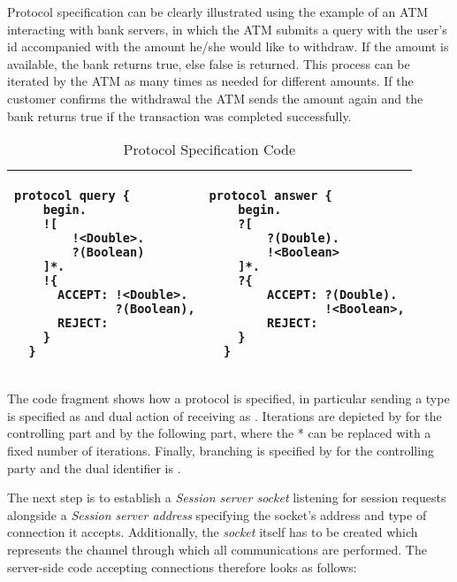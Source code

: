 Protocol specification can be clearly illustrated using the example of an ATM interacting with bank servers, in which the ATM submits a query with the user's id accompanied with the amount he/she would like to withdraw. If the amount is available, the bank returns true, else false is returned. This process can be iterated by the ATM as many times as needed for different amounts. If the customer confirms the withdrawal the ATM sends the amount again and the bank returns true if the transaction was completed successfully.

\begin{table}[H]
\center
\caption{Protocol Specification Code}
\begin{tabular}{|l|l|}
\hline

  \begin{lstlisting}[basicstyle=\LISTINGSTYLE]
  protocol query {
    begin.
    ![
        !<Double>.
        ?(Boolean)
    ]*.
    !{
      ACCEPT: !<Double>.
              ?(Boolean),
      REJECT:
    }
  }
  \end{lstlisting}
  &
  \begin{lstlisting}[basicstyle=\LISTINGSTYLE]
  protocol answer {
    begin.
    ?[
        ?(Double).
        !<Boolean>
    ]*.
    ?{
        ACCEPT: ?(Double).
                !<Boolean>,
        REJECT:
    }
  }
  \end{lstlisting}\\
  \hline
  
\end{tabular}
\label{CODEprotocol}
\end{table}

The code fragment shows how a protocol is specified, in particular sending a type is specified as  and dual action of receiving as . Iterations are depicted by \LST{![...]*} for the controlling part and  by the following part, where the * can be replaced with a fixed number of iterations. Finally, branching is specified by  for the controlling party and the dual identifier is .

The next step is to establish a \textit{Session server socket} listening for session requests alongside a \textit{Session server address} specifying the socket's address and type of connection it accepts. Additionally, the \textit{socket} itself has to be created which represents the channel through which all communications are performed. The server-side code accepting connections therefore looks as follows:

